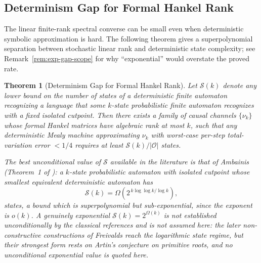 \documentclass[12pt]{article}
\newtheorem{theorem}{Theorem}[section]
\theoremstyle{definition}
\begin{document}
\subsection{Determinism Gap for Formal Hankel Rank}
\label{subsec:exp-determinism}

The linear finite-rank spectral converse can be small even when deterministic
symbolic approximation is hard.  The following theorem gives a
superpolynomial separation between stochastic linear rank and deterministic
state complexity; see Remark~\ref{rem:exp-gap-scope} for why ``exponential''
would overstate the proved rate.

\begin{theorem}[Determinism Gap for Formal Hankel Rank]
\label{thm:exp-gap}
Let $\mathcal S(k)$ denote any lower bound on the number of states of a
deterministic finite automaton recognizing a language that some $k$-state
probabilistic finite automaton recognizes with a fixed isolated cutpoint.  Then
there exists a family of causal channels $\{\nu_k\}$ whose formal Hankel
matrices have \emph{algebraic} rank at most $k$, such that any deterministic
Mealy machine approximating $\nu_k$ with worst-case per-step total-variation
error $<1/4$ requires at least $\mathcal S(k)/|\mathcal O|$ states.

The best unconditional value of $\mathcal S$ available in the literature is
that of Ambainis (Theorem~1 of \cite{ambainis1996}): a $k$-state probabilistic
automaton with isolated cutpoint whose smallest equivalent deterministic
automaton has
\[
\mathcal S(k)
=
\Omega\!\left(2^{\,k\log\log k/\log k}\right),
\]
states, a bound which is superpolynomial but \emph{sub}-exponential, since the
exponent is $o(k)$.  A genuinely exponential $\mathcal S(k)=2^{\Omega(k)}$ is not
established unconditionally by the classical references and is not assumed
here: the later non-constructive constructions of Freivalds
\cite{freivalds2008} reach the logarithmic state regime, but their strongest
form rests on Artin's conjecture on primitive roots, and no unconditional
exponential value is quoted here.
\end{theorem}
\end{document}
